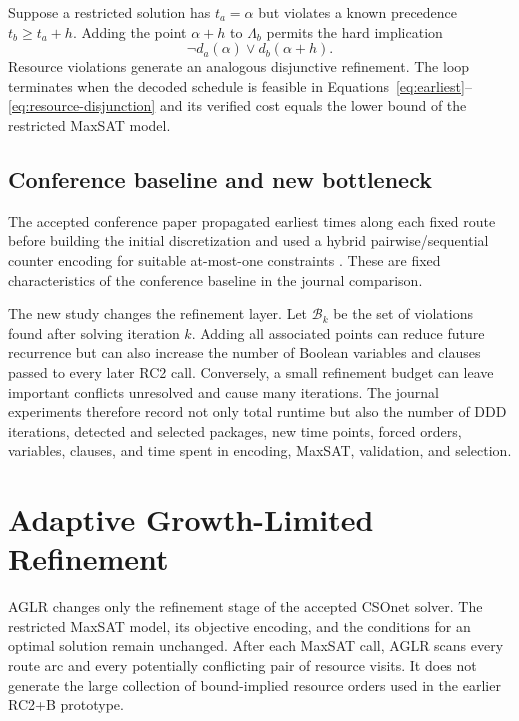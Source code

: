 \documentclass[preprint,12pt,authoryear]{elsarticle}
\begin{document}
Suppose a restricted solution has $t_a=\alpha$ but violates a known precedence
$t_b\ge t_a+h$. Adding the point $\alpha+h$ to $\Lambda_b$ permits the hard
implication
\begin{equation}
\neg d_a(\alpha)\lor d_b(\alpha+h).
\label{eq:refinement-implication}
\end{equation}
Resource violations generate an analogous disjunctive refinement. The loop
terminates when the decoded schedule is feasible in
Equations~\eqref{eq:earliest}--\eqref{eq:resource-disjunction} and its verified
cost equals the lower bound of the restricted MaxSAT model.

\subsection{Conference baseline and new bottleneck}

The accepted conference paper propagated earliest times along each fixed route
before building the initial discretization and used a hybrid pairwise/sequential
counter encoding for suitable at-most-one constraints
\citep{KieuEtAl2026Conference,Sinz2005}. These are fixed characteristics of the
conference baseline in the journal comparison.

The new study changes the refinement layer. Let $\mathcal B_k$ be the set of
violations found after solving iteration $k$. Adding all associated points can
reduce future recurrence but can also increase the number of Boolean variables
and clauses passed to every later RC2 call. Conversely, a small refinement
budget can leave important conflicts unresolved and cause many iterations.
The journal experiments therefore record not only total runtime but also the
number of DDD iterations, detected and selected packages, new time points,
forced orders, variables, clauses, and time spent in encoding, MaxSAT,
validation, and selection.

\section{Adaptive Growth-Limited Refinement}
\label{sec:method}

AGLR changes only the refinement stage of the accepted CSOnet solver. The
restricted MaxSAT model, its objective encoding, and the conditions for an
optimal solution remain unchanged. After each MaxSAT call, AGLR scans every
route arc and every potentially conflicting pair of resource visits. It does
not generate the large collection of bound-implied resource orders used in the
earlier RC2+B prototype.
\end{document}
